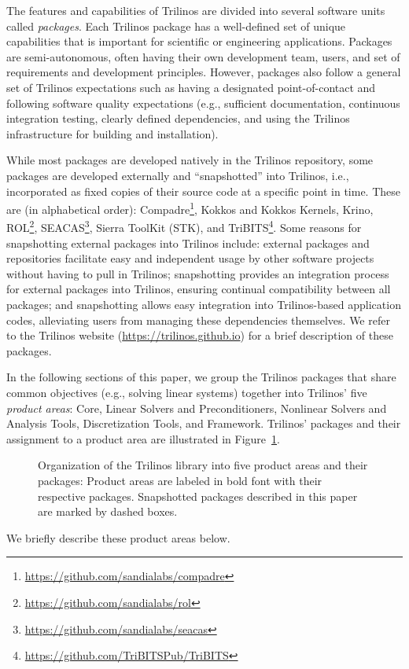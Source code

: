 The features and capabilities of Trilinos are divided into several software units called \textit{packages}.
Each Trilinos package has a well-defined set of unique capabilities that is important for scientific or engineering applications. Packages are semi-autonomous, often having their own development team, users, and set of requirements and development principles.  However, packages also follow a general set of Trilinos expectations such as having a designated point-of-contact and following software quality expectations (e.g., sufficient documentation, continuous integration testing, clearly defined dependencies, and using the Trilinos infrastructure for building and installation).

While most packages are developed natively in the Trilinos repository, some packages are developed externally and ``snapshotted'' into Trilinos,
i.e., incorporated as fixed copies of their source code at a specific point in time.
These are (in alphabetical order):
Compadre\footnote{\url{https://github.com/sandialabs/compadre}},
Kokkos and Kokkos Kernels,
Krino,
ROL\footnote{\url{https://github.com/sandialabs/rol}},
SEACAS\footnote{\url{https://github.com/sandialabs/seacas}},
Sierra ToolKit (STK),
and TriBITS\footnote{\url{https://github.com/TriBITSPub/TriBITS}}.
Some reasons for snapshotting external packages into Trilinos include:
external packages and repositories facilitate easy and independent usage by other software projects without having to pull in Trilinos;
snapshotting provides an integration process for external packages into Trilinos, ensuring continual compatibility between all packages;
and snapshotting allows easy integration into Trilinos-based application codes, alleviating users from managing these dependencies themselves.
We refer to the Trilinos website (\url{https://trilinos.github.io}) for a brief description of these packages.

In the following sections of this paper, we group the Trilinos packages that share common objectives (e.g., solving linear systems) together into Trilinos' five \textit{product areas}:  Core, Linear Solvers and Preconditioners, Nonlinear Solvers and Analysis Tools, Discretization Tools, and Framework.
Trilinos' packages and their assignment to a product area are illustrated in Figure~\ref{fig:GraphicalOverview}.
\begin{figure}
\centering

\caption{Organization of the Trilinos library into five product areas and their packages: Product areas are labeled in bold font with their respective packages.
Snapshotted packages described in this paper are marked by dashed boxes.}
\label{fig:GraphicalOverview}
\end{figure}
We briefly describe these product areas below.

